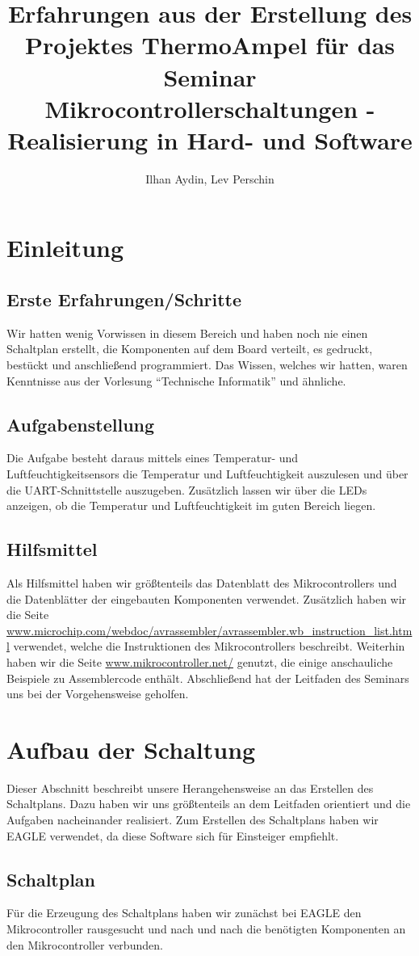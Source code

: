 \documentclass[]{article}
\title{Erfahrungen aus der Erstellung des Projektes \glqq ThermoAmpel\grqq{} für das Seminar \glqq Mikrocontrollerschaltungen - Realisierung in Hard- und Software\grqq}
\author{Ilhan Aydin, Lev Perschin}
\begin{document}
\maketitle
\newpage
\section{Einleitung}
\subsection{Erste Erfahrungen/Schritte}
Wir hatten wenig Vorwissen in diesem Bereich und haben noch nie einen Schaltplan erstellt, die Komponenten auf dem Board verteilt, es gedruckt, bestückt und anschließend programmiert. Das Wissen, welches wir hatten, waren Kenntnisse aus der Vorlesung "`Technische Informatik"' und ähnliche.
\subsection{Aufgabenstellung}
Die Aufgabe besteht daraus mittels eines Temperatur- und Luftfeuchtigkeitsensors die Temperatur und Luftfeuchtigkeit auszulesen und über die UART-Schnittstelle auszugeben. Zusätzlich lassen wir über die LEDs anzeigen, ob die Temperatur und Luftfeuchtigkeit im guten Bereich liegen.
\subsection{Hilfsmittel}
Als Hilfsmittel haben wir größtenteils das Datenblatt des Mikrocontrollers und die Datenblätter der eingebauten Komponenten verwendet. Zusätzlich haben wir die Seite \url{www.microchip.com/webdoc/avrassembler/avrassembler.wb_instruction_list.html} verwendet, welche die Instruktionen des Mikrocontrollers beschreibt. Weiterhin haben wir die Seite \url{www.mikrocontroller.net/} genutzt, die einige anschauliche Beispiele zu Assemblercode enthält. Abschließend hat der Leitfaden des Seminars uns bei der Vorgehensweise geholfen.
\section{Aufbau der Schaltung}
Dieser Abschnitt beschreibt unsere Herangehensweise an das Erstellen des Schaltplans. Dazu haben wir uns größtenteils an dem Leitfaden orientiert und die Aufgaben nacheinander realisiert. Zum Erstellen des Schaltplans haben wir EAGLE verwendet, da diese Software sich für Einsteiger empfiehlt.

\subsection{Schaltplan}
Für die Erzeugung des Schaltplans haben wir zunächst bei EAGLE den Mikrocontroller rausgesucht und nach und nach die benötigten Komponenten an den Mikrocontroller verbunden.
\end{document}
